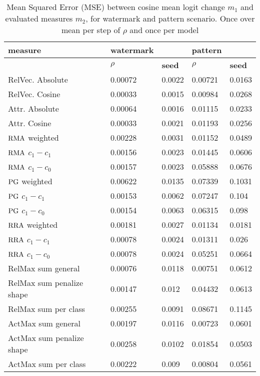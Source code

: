 \begin{table}[!ht]
    \centering
    \begin{tabular}{l|ll|ll}
    \hline
        \textbf{measure}& \textbf{watermark} &  & \textbf{pattern} &  \\ \hline
        & $\rho$ & \textbf{seed} & $\rho$  & \textbf{seed} \\ \hline
        RelVec. Absolute & 0.00072 & 0.0022 & 0.00721 & 0.0163 \\ 
        RelVec. Cosine & 0.00033 & 0.0015 & 0.00984 & 0.0268 \\ 
        Attr. Absolute & 0.00064 & 0.0016 & 0.01115 & 0.0233 \\ 
        Attr. Cosine & 0.00033 & 0.0021 & 0.01193 & 0.0256 \\  \hline
        $\operatorname*{RMA}$ weighted & 0.00228 & 0.0031 & 0.01152 & 0.0489 \\ 
        $\operatorname*{RMA}$ $c_1- c_1$ & 0.00156 & 0.0023 & 0.01445 & 0.0606 \\ 
        $\operatorname*{RMA}$ $c_1 - c_0$ & 0.00157 & 0.0023 & 0.05888 & 0.0676 \\ 
        $\operatorname*{PG}$ weighted & 0.00622 & 0.0135 & 0.07339 & 0.1031 \\ 
        $\operatorname*{PG}$ $c_1- c_1$ & 0.00153 & 0.0062 & 0.07247 & 0.104 \\ 
        $\operatorname*{PG}$ $c_1 - c_0$ & 0.00154 & 0.0063 & 0.06315 & 0.098 \\ 
        $\operatorname*{RRA}$ weighted & 0.00181 & 0.0027 & 0.01134 & 0.0181 \\ 
        $\operatorname*{RRA}$ $c_1- c_1$ & 0.00078 & 0.0024 & 0.01311 & 0.026 \\ 
        $\operatorname*{RRA}$ $c_1 - c_0$ & 0.00078 & 0.0024 & 0.05251 & 0.0664 \\  \hline
        RelMax sum general & 0.00076 & 0.0118 & 0.00751 & 0.0612 \\ 
        RelMax sum penalize shape & 0.00147 & 0.012 & 0.04432 & 0.0613 \\ 
        RelMax sum per class & 0.00255 & 0.0091 & 0.08671 & 0.1145 \\ 
        ActMax sum general & 0.00197 & 0.0116 & 0.00723 & 0.0601 \\ 
        ActMax sum penalize shape & 0.00258 & 0.0102 & 0.01854 & 0.0503 \\ 
        ActMax sum per class & 0.00222 & 0.009 & 0.00804 & 0.0561 \\ \hline
    \end{tabular}
    \caption{Mean Squared Error (MSE) between cosine mean logit change $m_1$ and evaluated measures $m_2$, for watermark and pattern scenario. Once over mean per step of $\rho$ and once per model}
\end{table}